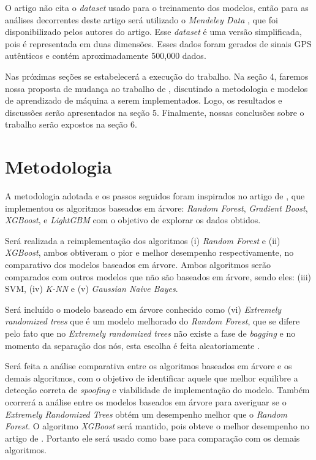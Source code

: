 \documentclass[12pt]{article}
\begin{document}
O artigo \cite{Aissou2021} não cita o \textit{dataset}
usado para o treinamento dos modelos, 
então para as análises decorrentes deste artigo
será utilizado o \textit{Mendeley Data} 
\cite{aissou2022dataset}, que foi disponibilizado pelos autores do artigo. 
Esse \textit{dataset} é uma versão simplificada,
pois é representada em duas dimensões. Esses dados foram gerados de sinais
GPS autênticos e contém aproximadamente 500,000 dados.

Nas próximas seções se estabelecerá a execução do trabalho.
Na seção 4, faremos nossa proposta de mudança
ao trabalho de \cite{Aissou2021}, discutindo a 
metodologia e modelos de aprendizado de máquina a
serem implementados. Logo, os resultados e 
discussões serão apresentados na seção 5.
Finalmente, nossas conclusões sobre o trabalho serão expostos na seção 6.

\section{Metodologia}
A metodologia adotada e os passos seguidos
foram inspirados no artigo de \cite{Aissou2021}, 
que implementou os algoritmos baseados em árvore: 
\textit{Random Forest}, \textit{Gradient Boost}, \textit{XGBoost}, e 
\textit{LightGBM} com o objetivo de explorar os dados obtidos.

Será realizada a reimplementação dos algoritmos (i) \textit{Random Forest}
e (ii) \textit{XGBoost}, ambos obtiveram o pior
e melhor desempenho respectivamente,
no comparativo dos modelos baseados em árvore. 
Ambos algoritmos serão comparados com outros
modelos que não são baseados em árvore,
sendo eles: (iii) SVM, (iv) \textit{K-NN} e
(v) \textit{Gaussian Naive Bayes}.

Será incluído o modelo baseado em árvore conhecido como
(vi) \textit{Extremely randomized trees} que é um modelo melhorado
do \textit{Random Forest}, que se difere pelo fato
que no \textit{Extremely randomized trees} não existe a fase
de \textit{bagging} e no momento da separação dos nós,
esta escolha é feita aleatoriamente \cite{geurtsExtremelyRandomizedTrees2006}.

Será feita a análise comparativa entre os algoritmos baseados em árvore
e os demais algoritmos, com o objetivo de identificar
aquele que melhor equilibre a detecção correta
de \textit{spoofing} e viabilidade de implementação do modelo.
Também ocorrerá a análise entre os modelos baseados em árvore
para averiguar se o \textit{Extremely Randomized Trees}
obtém um desempenho melhor que o \textit{Random Forest}.
O algoritmo \textit{XGBoost}
será mantido, pois obteve o melhor desempenho
no artigo de \cite{Aissou2021}. Portanto ele será usado como base
para comparação com os demais algoritmos.
\end{document}
